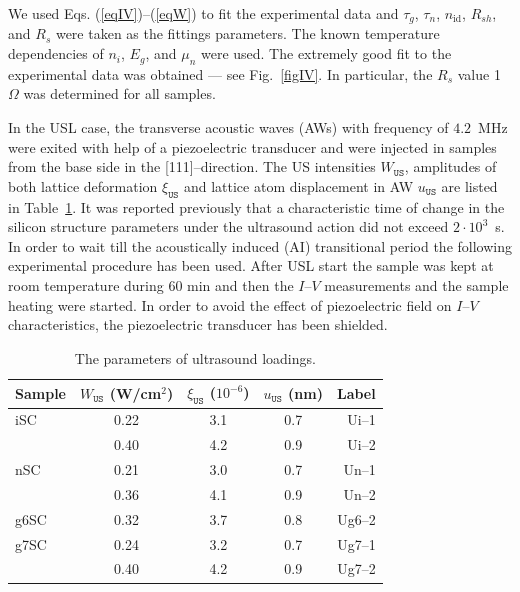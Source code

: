 \documentclass[aip,jap, amsmath,amssymb,reprint]{revtex4-1}
\begin{document}
We used Eqs. (\ref{eqIV})--(\ref{eqW}) to fit the experimental data and $\tau_g$, $\tau_n$, $n_{\mathrm{id}}$, $R_{sh}$, and $R_s$ were taken as the  fittings parameters.
The known \cite{ni:Green,Schroder2006,Markvart} temperature dependencies of $n_i$, $E_g$, and $\mu_n$ were used.
The extremely good fit to the experimental data was obtained --- see Fig.~\ref{figIV}.
In particular, the $R_s$ value 1~$\Omega$ was determined for all samples.


In the USL case, the transverse acoustic waves (AWs) with frequency of $4.2$~MHz were exited with help of a piezoelectric transducer and were injected in samples from the base side in the [111]--direction.
The US intensities $W_{\mathtt{US}}$, amplitudes of both lattice deformation $\xi_{\mathtt{US}}$ and lattice atom
displacement  in AW $u_{\mathtt{US}}$ are listed in Table~\ref{tabUSL}.
It was reported previously \cite{Ostapenko1995,Olikh:Ultras,Ostrovskii2001} that a characteristic time of change in the silicon structure parameters under the ultrasound action  did not exceed $2\cdot10^3$~s.
In order to wait till the acoustically induced (AI) transitional period the following experimental procedure has been used.
After USL start the sample was kept at room temperature during 60 min and then the $I$--$V$ measurements and the sample heating were started.
In order to avoid the effect of piezoelectric field on $I$--$V$ characteristics, the piezoelectric transducer has been shielded.


\begin{table}
\caption{\label{tabUSL}The parameters of ultrasound loadings.
}
\begin{ruledtabular}
\begin{tabular}{lcccr}
Sample&$W_{\mathtt{US}}$ (W/cm$^2$)&$\xi_{\mathtt{US}}$ ($10^{-6}$)&$u_{\mathtt{US}}$ (nm)&Label\\
\hline
iSC&0.22&3.1&0.7&Ui--1\\
&0.40&4.2&0.9&Ui--2\\
nSC&0.21&3.0&0.7&Un--1\\
&0.36&4.1&0.9&Un--2\\
g6SC&0.32&3.7&0.8&Ug6--2\\
g7SC&0.24&3.2&0.7&Ug7--1\\
&0.40&4.2&0.9&Ug7--2\\
\end{tabular}
\end{ruledtabular}
\end{table}
\end{document}
